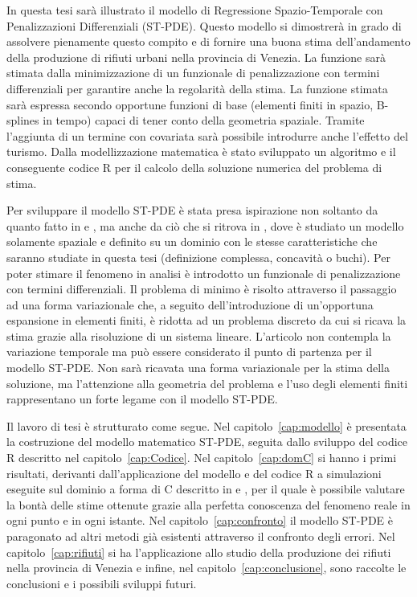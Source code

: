 \documentclass[a4paper,11pt,twoside,openright]{book}							%
\begin{document}
In questa tesi sarà illustrato il modello di Regressione Spazio-Temporale con Penalizzazioni Differenziali (ST-PDE). Questo modello si dimostrerà in grado di assolvere pienamente questo compito e di fornire una buona stima dell'andamento della produzione di rifiuti urbani nella provincia di Venezia. La funzione sarà stimata dalla minimizzazione di un funzionale di penalizzazione con termini differenziali per garantire anche la regolarità della stima. La funzione stimata sarà espressa secondo opportune funzioni di base (elementi finiti in spazio, B-splines in tempo) capaci di tener conto della geometria spaziale. Tramite l'aggiunta di un termine con covariata sarà possibile introdurre anche l'effetto del turismo. Dalla modellizzazione matematica è stato sviluppato un algoritmo e il conseguente codice R per il calcolo della soluzione numerica del problema di stima. 

Per sviluppare il modello ST-PDE è stata presa ispirazione non soltanto da quanto fatto in \cite{art:augustin} e \cite{art:marra}, ma anche da ciò che si ritrova in \cite{art:sangalli}, dove è studiato un modello solamente spaziale e definito su un dominio con le stesse caratteristiche che saranno studiate in questa tesi (definizione complessa, concavità o buchi). Per poter stimare il fenomeno in analisi è introdotto un funzionale di penalizzazione con termini differenziali. Il problema di minimo è risolto attraverso il passaggio ad una forma variazionale che, a seguito dell'introduzione di un'opportuna espansione in elementi finiti, è ridotta ad un problema discreto da cui si ricava la stima grazie alla risoluzione di un sistema lineare. L'articolo \cite{art:sangalli} non contempla la variazione temporale ma può essere considerato il punto di partenza per il modello ST-PDE. Non sarà ricavata una forma variazionale per la stima della soluzione, ma l'attenzione alla geometria del problema e l'uso degli elementi finiti rappresentano un forte legame con il modello ST-PDE.

Il lavoro di tesi è strutturato come segue. Nel capitolo~\ref{cap:modello} è presentata la costruzione del modello matematico ST-PDE, seguita dallo sviluppo del codice R descritto nel capitolo~\ref{cap:Codice}. Nel capitolo~\ref{cap:domC} si hanno i primi risultati, derivanti dall'applicazione del modello e del codice R a simulazioni eseguite sul dominio a forma di C descritto in \cite{art:ramsay} e \cite{art:wood}, per il quale è possibile valutare la bontà delle stime ottenute grazie alla perfetta conoscenza del fenomeno reale in ogni punto e in ogni istante. Nel capitolo~\ref{cap:confronto} il modello ST-PDE è paragonato ad altri metodi già esistenti attraverso il confronto degli errori. Nel capitolo~\ref{cap:rifiuti} si ha l'applicazione allo studio della produzione dei rifiuti nella provincia di Venezia e infine, nel capitolo~\ref{cap:conclusione}, sono raccolte le conclusioni e i possibili sviluppi futuri.
\newpage
\thispagestyle{empty}
\end{document}
